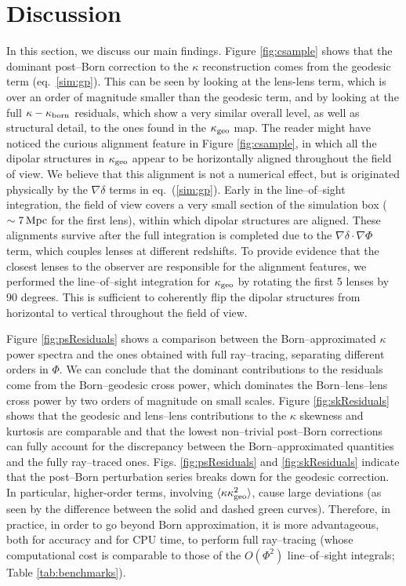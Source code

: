 \documentclass[reprint,aps,prd,superscriptaddress,showkeys,showpacs]{revtex4-1}
\begin{document}
\section{Discussion}
\label{sec:discuss}
% 
In this section, we discuss our main findings. Figure \ref{fig:csample} shows that the dominant post--Born correction to the $\kappa$ reconstruction comes from the geodesic term (eq.~\ref{sim:gp}). This can be seen by looking at the lens-lens term, which is over an order of magnitude smaller than the geodesic term, and by looking at the full $\kappa-\kappa_{\rm born}$ residuals, which show a very similar overall level, as well as structural detail, to the ones found in the $\kappa_{\rm geo}$ map. The reader might have noticed the curious alignment feature in Figure \ref{fig:csample}, in which all the dipolar structures in $\kappa_{\rm geo}$ appear to be horizontally aligned throughout the field of view. We believe that this alignment is not a numerical effect, but is originated physically by the $\nabla\delta$ terms in eq.~(\ref{sim:gp}). Early in the line--of--sight integration, the field of view covers a very small section of the simulation box ($\sim7\,{\rm Mpc}$ for the first lens), within which dipolar structures are aligned. These alignments survive after the full integration is completed due to the $\nabla\delta\cdot\nabla\Phi$ term, which couples lenses at different redshifts. To provide evidence that the closest lenses to the observer are responsible for the alignment features, we performed the line--of--sight integration for $\kappa_{\rm geo}$ by rotating the first 5 lenses by 90 degrees. This is sufficient to coherently flip the dipolar structures from horizontal to vertical throughout the field of view.

Figure \ref{fig:psResiduals} shows a comparison between the Born--approximated $\kappa$ power spectra and the ones obtained with full ray--tracing, separating different orders in $\Phi$. We can conclude that the dominant contributions to the residuals come from the Born--geodesic cross power, which dominates the Born--lens--lens cross power by two orders of magnitude on small scales. Figure \ref{fig:skResiduals} shows that the geodesic and lens--lens contributions to the $\kappa$ skewness and kurtosis are comparable and that the lowest non--trivial post--Born corrections can fully account for the discrepancy between the Born--approximated quantities and the fully ray--traced ones.    Figs. \ref{fig:psResiduals} and \ref{fig:skResiduals} indicate that the post--Born perturbation series breaks down for the geodesic correction.  In particular, higher-order terms, involving $\langle \kappa \kappa_{\rm geo}^2\rangle$, cause large deviations (as seen by the difference between the solid and dashed green curves).  Therefore, in practice, in order to go beyond Born approximation, it is more advantageous, both for accuracy and for CPU time, to perform full ray--tracing (whose computational cost is comparable to those of the $O(\Phi^2)$ line--of--sight integrals; Table \ref{tab:benchmarks}).
\end{document}
